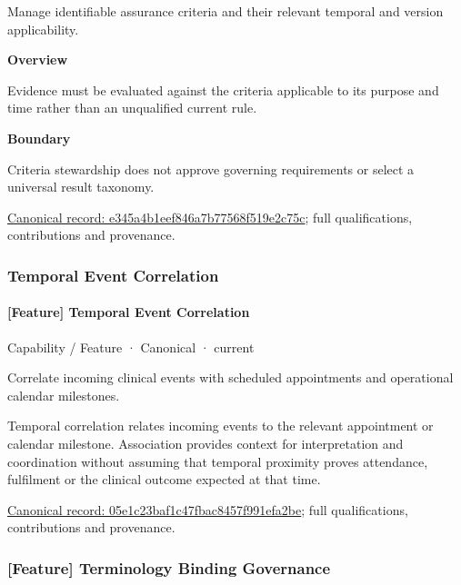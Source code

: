 Manage identifiable assurance criteria and their relevant temporal and version applicability.



\textbf{Overview}



Evidence must be evaluated against the criteria applicable to its purpose and time rather than an unqualified current rule.



\textbf{Boundary}



Criteria stewardship does not approve governing requirements or select a universal result taxonomy.


{\footnotesize \href{../../../../continuum/strategy/capability/feature/e345a4b1eef846a7b77568f519e2c75c.md}{Canonical record: e345a4b1eef846a7b77568f519e2c75c}; full qualifications, contributions and provenance.}\par
\subsubsection{Temporal Event Correlation}

\paragraph{[Feature] Temporal Event Correlation}

\label{element:05e1c23baf1c47fbac8457f991efa2be}
{\small Capability / Feature · Canonical · current}\par

Correlate incoming clinical events with scheduled appointments and operational calendar milestones.



Temporal correlation relates incoming events to the relevant appointment or calendar milestone. Association provides context for interpretation and coordination without assuming that temporal proximity proves attendance, fulfilment or the clinical outcome expected at that time.


{\footnotesize \href{../../../../continuum/strategy/capability/feature/05e1c23baf1c47fbac8457f991efa2be.md}{Canonical record: 05e1c23baf1c47fbac8457f991efa2be}; full qualifications, contributions and provenance.}\par
\subsubsection{[Feature] Terminology Binding Governance}

